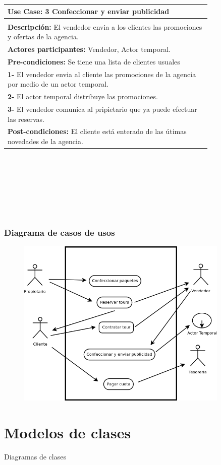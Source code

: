 \documentclass[12pt,a4paper,titlepage,oneside]{article}
\begin{document}
\begin{tabular}{| l | p{0.8\linewidth} |} \hline
	\multicolumn{2}{|p{0.8\linewidth}|}{\textbf{Use Case:} 3 Confeccionar y enviar publicidad} \\ \hline
	\multicolumn{2}{|c|}{} \\ \hline
	\multicolumn{2}{|p{0.8\linewidth}|}{\textbf{Descripci\'on:} El vendedor envia a los clientes las promociones y ofertas de la agencia.} \\ \hline
	\multicolumn{2}{|p{0.8\linewidth}|}{\textbf{Actores participantes:} Vendedor, Actor temporal.} \\ \hline
	\multicolumn{2}{|p{0.8\linewidth}|}{\textbf{Pre-condiciones:} Se tiene una lista de clientes usuales} \\ \hline
	\multicolumn{2}{|p{0.8\linewidth}|}{\textbf{1-} El vendedor envia al cliente las promociones de la agencia por medio de un actor temporal.} \\
	\multicolumn{2}{|p{0.8\linewidth}|}{\textbf{2-} El actor temporal distribuye las promociones.} \\ \hline
	\multicolumn{2}{|p{0.8\linewidth}|}{\textbf{3-} El vendedor comunica al pripietario que ya puede efectuar las reservas.}\\ \hline
	\multicolumn{2}{|p{0.8\linewidth}|}{\textbf{Post-condiciones:} El cliente está enterado de las útimas novedades de la agencia.}\\ \hline
\end{tabular} \\\\
\\\\\\\\


\subsubsection{Diagrama de casos de usos}
 
\begin{figure}[htb]
\centerline{\includegraphics[width=0.9\textwidth]{diagramaCasosDeUso}}
\label{fig:celda}
\end{figure}
 
 
 
\section{Modelos de clases}

Diagramas de clases  
 
 
\end{document}
